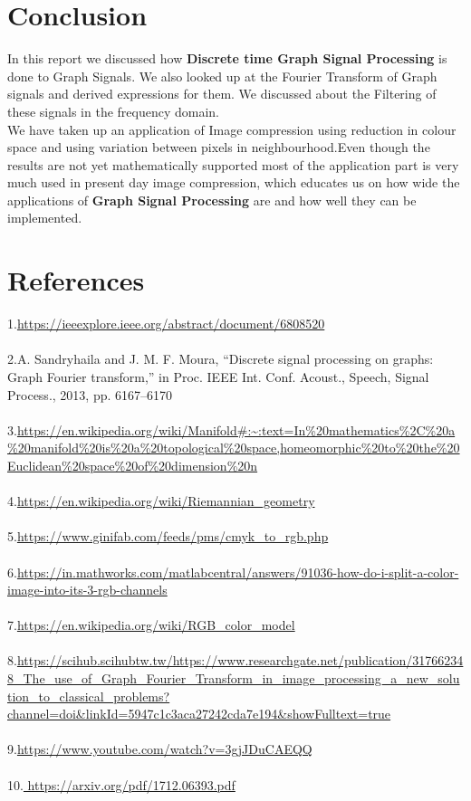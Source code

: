 \documentclass[12pt,onecolumn]{article}
\begin{document}
\section{\textbf{Conclusion}}
In this report we discussed how \textbf{Discrete time Graph Signal Processing} is done to Graph Signals. We also looked up at the Fourier Transform of Graph signals and derived expressions for them.
We discussed about the Filtering of these signals in the frequency domain.\\
We have taken up an application of Image compression using reduction in colour space and using variation between pixels in neighbourhood.Even though the results are not yet mathematically supported most of the application part is very much used in present day image compression, which educates us on how wide the applications of \textbf{Graph Signal Processing} are and how well they can be implemented.\\  

\section{\textbf{References}}
1.\url{https://ieeexplore.ieee.org/abstract/document/6808520}\\ \\
2.A. Sandryhaila and J. M. F. Moura, “Discrete signal processing on graphs: Graph Fourier transform,” in Proc. IEEE Int. Conf. Acoust., Speech, Signal Process., 2013, pp. 6167–6170 \\ \\
3.\url{https://en.wikipedia.org/wiki/Manifold#:~:text=In%20mathematics%2C%20a%20manifold%20is%20a%20topological%20space,homeomorphic%20to%20the%20Euclidean%20space%20of%20dimension%20n} \\ \\
4.\url{https://en.wikipedia.org/wiki/Riemannian_geometry}\\ \\
5.\url{https://www.ginifab.com/feeds/pms/cmyk_to_rgb.php}\\ \\
6.\url{https://in.mathworks.com/matlabcentral/answers/91036-how-do-i-split-a-color-image-into-its-3-rgb-channels}\\ \\
7.\url{https://en.wikipedia.org/wiki/RGB_color_model}\\ \\
8.\url{https://scihub.scihubtw.tw/https://www.researchgate.net/publication/317662348_The_use_of_Graph_Fourier_Transform_in_image_processing_a_new_solution_to_classical_problems?channel=doi&linkId=5947c1c3aca27242cda7e194&showFulltext=true} \\ \\
9.\url{https://www.youtube.com/watch?v=3gjJDuCAEQQ} \\ \\
10.\url{ https://arxiv.org/pdf/1712.06393.pdf} 
\end{document}
